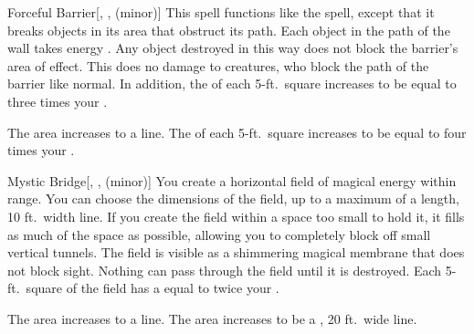 \lowercase{\hypertarget{spell:Forceful Barrier}{}}\label{spell:Forceful Barrier}
\begin{freeability}[Rank 3]{\hypertarget{spell:Forceful Barrier}{Forceful Barrier}}[, ,  (minor)]
\targetrule
This spell functions like the  spell, except that it breaks objects in its area that obstruct its path.
Each object in the path of the wall takes energy .
Any object destroyed in this way does not block the barrier's area of effect.
This does no damage to creatures, who block the path of the barrier like normal.
In addition, the  of each 5-ft.\ square increases to be equal to three times your .

\rankline
{} The area increases to a \arealarge line.
 The  of each 5-ft.\ square increases to be equal to four times your .

\end{freeability}
\vspace{0.25em}



\lowercase{\hypertarget{spell:Mystic Bridge}{}}\label{spell:Mystic Bridge}
\begin{freeability}[Rank 3]{\hypertarget{spell:Mystic Bridge}{Mystic Bridge}}[, ,  (minor)]
\targetrule
You create a horizontal field of magical energy within \rngmed range.
You can choose the dimensions of the field, up to a maximum of a \areamed length, 10 ft.\ width line.
If you create the field within a space too small to hold it, it fills as much of the space as possible, allowing you to completely block off small vertical tunnels.
The field is visible as a shimmering magical membrane that does not block sight.
Nothing can pass through the field until it is destroyed.
Each 5-ft.\ square of the field has a  equal to twice your .

\rankline
{} The area increases to a \arealarge line.
 The area increases to be a \areahuge, 20 ft.\ wide line.

\end{freeability}
\vspace{0.25em}



